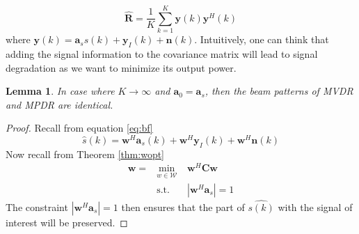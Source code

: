 \documentclass[12pt]{article}
\newtheorem{lemma}{Lemma}
\begin{document}
\begin{equation}\label{eq:chat}
    \hat{\mathbf{R}} = \frac{1}{K}\sum_{k=1}^K \mathbf{y}(k)\mathbf{y}^H(k)
\end{equation}
where $\mathbf{y}(k) = \mathbf{a}_ss(k) + \mathbf{y}_I(k)+\mathbf{n}(k)$. Intuitively, one can think that adding the signal information to the covariance matrix will lead to signal degradation as we want to minimize its output power. 
\begin{lemma}
    In case where $K\rightarrow\infty$ and $\mathbf{a}_0 = \mathbf{a}_s$, then the beam patterns of MVDR and MPDR are identical.
\end{lemma}
\begin{proof}
    Recall from equation \ref{eq:bf}
    \begin{equation*}
        \hat{s}(k)=\mathbf{w}^H\mathbf{a}_s(k) + \mathbf{w}^H\mathbf{y}_I(k) + \mathbf{w}^H\mathbf{n}(k)
    \end{equation*}
    Now recall from Theorem \ref{thm:wopt} 
    $$\begin{aligned}
    \mathbf{w} =& \min_{w\in\mathcal{W}} &\mathbf{w}^H\mathbf{C}\mathbf{w}\\
    & \textrm{s.t.} \quad &|\mathbf{w}^H\mathbf{a}_s| = 1
\end{aligned}$$
    The constraint $|\mathbf{w}^H\mathbf{a}_s| = 1$ then ensures that the part of $\hat{s(k)}$ with the signal of interest will be preserved.
\end{proof}
\end{document}

